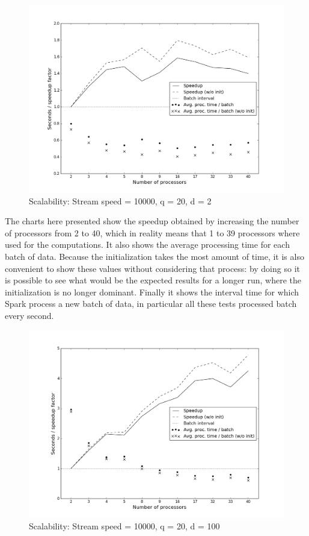 \documentclass[10pt, conference, compsocconf]{IEEEtran}
\begin{document}
\begin{figure}[h!]
 \centering
 \includegraphics[scale=0.3]{./styles/perf20-2.png}
 \caption{Scalability: Stream speed = 10000, q = 20, d = 2}
 \label{fig:perf20-2}
\end{figure}


The charts here presented show the speedup obtained by increasing the number of processors from 2 to 40, which in reality means that 1 to 39 processors where used for the computations. It also shows the average processing time for each batch of data. Because the initialization takes the most amount of time, it is also convenient to show these values without considering that process: by doing so it is possible to see what would be the expected results for a longer run, where the initialization is no longer dominant. Finally it shows the interval time for which Spark process a new batch of data, in particular all these tests processed batch every second.



\begin{figure}[h!]
 \centering
 \includegraphics[scale=0.3]{./styles/perf20-100.png}
 \caption{Scalability: Stream speed = 10000, q = 20, d = 100}
 \label{fig:perf20-100}
\end{figure}
\end{document}
